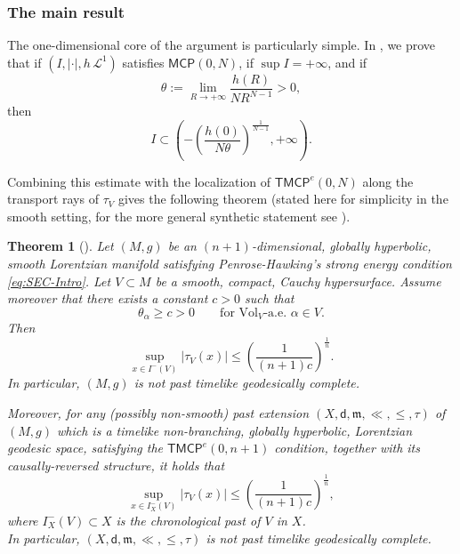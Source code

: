\documentclass[a4paper,10pt]{article}
\newcommand{\MCP}{\mathsf{MCP}}
\newcommand{\vol}{\mathrm{Vol}}
\newcommand{\TMCP}{\mathsf{TMCP}}
\newcommand{\mm}{\mathfrak m}
\newcommand{\sfd}{\mathsf d}
\theoremstyle{plain}
\newtheorem{theorem}[lemma]{Theorem}
\theoremstyle{definition}
\numberwithin{equation}{section}
\begin{document}
\subsubsection*{The main result}


The one-dimensional core of the argument is particularly simple. In , we prove that if
$(I,|\cdot|,h\,\mathcal L^1)$ satisfies $\MCP(0,N)$, if
$\sup I=+\infty$, and if
\[
    \theta
    :=
    \lim_{R\to+\infty}\frac{h(R)}{N R^{N-1}}>0,
\]
then
\[
    I\subset
    \left(
    -\left(\frac{h(0)}{N\theta}\right)^{\frac1{N-1}},
    +\infty
    \right).
\]


Combining this estimate with the localization of $\TMCP^e(0,N)$ along the
transport rays of $\tau_V$ gives the following theorem (stated here for simplicity in the smooth setting, for the more general synthetic statement see ).

\begin{theorem}[]
Let $(M,g)$ be an $(n+1)$-dimensional, globally hyperbolic, smooth Lorentzian manifold satisfying Penrose-Hawking's strong energy condition \eqref{eq:SEC-Intro}. Let $V\subset M$ be a smooth, compact, Cauchy hypersurface.  Assume moreover that there exists a constant \( c>0 \) such that
\begin{equation}\label{eq:thetaalphageqc-intro}
\theta_\alpha \ge c >0
\qquad
\text{for \(\vol_V\)-a.e.\ \(\alpha \in V\)} .
\end{equation}%
Then 
\begin{equation*}\label{eq:tauVleq1/c-intro}
\sup_{x\in I^{-}(V)} |\tau_{V}(x)|  \leq \left(\frac{1}{(n+1)c}\right)^{\frac{1}{n}}.
\end{equation*}
In particular, $(M,g)$  is not past timelike geodesically complete.  



Moreover, for any (possibly non-smooth) past extension $(X,\sfd,\mm, \ll, \leq, \tau)$ of $(M,g)$ which is a timelike non-branching, globally hyperbolic, Lorentzian geodesic space,  satisfying  the $\mathsf{TMCP}^{e}(0,n+1)$ condition, together with its causally-reversed structure, it holds that
\begin{equation}\label{eq:tauVleq1/cCor1-Intro}
\sup_{x\in I^{-}_X(V)} |\tau_{V}(x)|  \leq \left(\frac{1}{(n+1)c}\right)^{\frac{1}{n}},
\end{equation}
where $I^{-}_X(V)\subset X$ is the chronological past of $V$ in $X$.
\\In particular, $(X,\sfd,\mm, \ll, \leq, \tau)$  is not past timelike geodesically complete.
\end{theorem}
\end{document}
